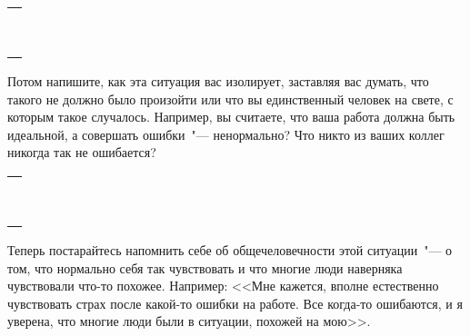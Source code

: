 \setlength{\extrarowheight}{2mm}
\begin{tabularx}{\textwidth}{X}
	\\
	\arrayrulecolor{gray}\hline\\
	\hline\\
	\hline\\
	\hline\\
	\hline\\
	\hline\\
	\hline\\
	\hline\\
	\hline\\
	\hline\\	
\end{tabularx}
\setlength{\extrarowheight}{0mm}

\begin{itemize}
	\itemWritingHand Потом напишите, как эта ситуация вас изолирует, заставляя вас думать, что такого не должно было произойти или что вы единственный человек на свете, с которым такое случалось. Например, вы считаете, что ваша работа должна быть идеальной, а совершать ошибки~"--- ненормально? Что никто из ваших коллег никогда так не ошибается?
\end{itemize}

\setlength{\extrarowheight}{2mm}
\begin{tabularx}{\textwidth}{X}
	\\
	\arrayrulecolor{gray}\hline\\
	\hline\\
	\hline\\
	\hline\\
	\hline\\
	\hline\\
	\hline\\
	\hline\\
	\hline\\
	\hline\\	
\end{tabularx}
\setlength{\extrarowheight}{0mm}

\begin{itemize}
	\itemWritingHand Теперь постарайтесь напомнить себе об общечеловечности этой ситуации~"--- о том, что нормально себя так чувствовать и что многие люди наверняка чувствовали что-то похожее. Например: <<Мне кажется, вполне естественно чувствовать страх после какой-то ошибки на работе. Все когда-то ошибаются, и я уверена, что многие люди были в ситуации, похожей на мою>>.
\end{itemize}

